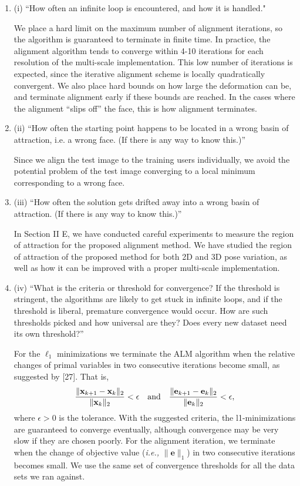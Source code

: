 \documentclass[11pt]{article}
\newcommand{\ie}{{\it i.e., }}
\newcommand{\e}{\mathbf{e}}
\newcommand{\x}{\mathbf{x}}
\begin{document}
\begin{enumerate}
\item (i) ``How often an infinite loop is encountered, and how it is handled."

We place a hard limit on the maximum number of alignment iterations, so the
algorithm is guaranteed to terminate in finite time.  In practice, the
alignment algorithm tends to converge within 4-10 iterations for each
resolution of the multi-scale implementation. This low number of iterations is expected, since the iterative alignment scheme is locally quadratically convergent. We also place hard bounds on how
large the deformation can be, and terminate alignment early if these bounds are
reached.  In the cases where the alignment ``slips off'' the face, this is how
alignment terminates.

\item (ii) ``How often the starting point happens to be located in a wrong basin of
attraction, i.e. a wrong face. (If there is any way to know this.)''

Since we align the test image to the training users individually, we avoid the
potential problem of the test image converging to a local minimum corresponding
to a wrong face.

\item (iii) ``How often the solution gets drifted away into a wrong basin of
attraction. (If there is any way to know this.)''

In Section II E, we have conducted careful experiments to measure the region of attraction
for the proposed alignment method. We have studied the region of attraction of the proposed
method for both 2D and 3D pose variation, as well as how it can be improved with a proper
multi-scale implementation.

\item (iv) ``What is the criteria or threshold for convergence? If the threshold is
stringent, the algorithms are likely to get stuck in infinite loops, and if the
threshold is liberal, premature convergence would occur. How are such
thresholds picked and how universal are they? Does every new dataset need its
own threshold?''

For the $\ell_1$ minimizations we terminate the ALM
algorithm when the relative changes of primal variables in
two consecutive iterations become small, as suggested by
[27]. That is,
\begin{displaymath}
\frac{\|\x_{k+1}-\x_k\|_2}{\|\x_k\|_2} < \epsilon \quad
\textup{and} \quad \frac{\|\e_{k+1}-\e_k\|_2}{\|\e_k\|_2} <
\epsilon,
\end{displaymath}
where $\epsilon>0$ is the tolerance. With the suggested
criteria, the l1-minimizations are guaranteed to converge
eventually, although convergence may be very slow if they
are chosen poorly. For the alignment
iteration, we terminate when the change of objective value
(\ie $\|\e\|_1$) in two consecutive iterations becomes
small. We use the same set of convergence thresholds for
all the data sets we ran against. 


\end{enumerate}
\end{document}
